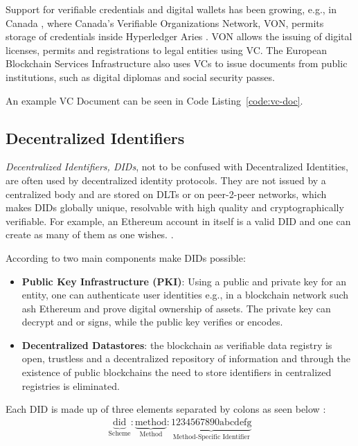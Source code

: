 Support for verifiable credentials and digital wallets has been growing, e.g., in Canada \cite{preukschat2021self},
where Canada's Verifiable Organizations Network, VON, permits storage of credentials inside Hyperledger Aries
\cite{hyperledger:wiki}. VON allows the issuing of digital licenses, permits and registrations to legal entities using
VC.
The European Blockchain Services Infrastructure also uses VCs to issue documents from public institutions, such as
digital diplomas and social security passes. \cite{williams2020cross}

An example VC Document can be seen in Code Listing~\ref{code:vc-doc}.

\subsection{Decentralized Identifiers} %
\label{sec:Decentralized Identifiers}
\textit{Decentralized Identifiers, DIDs}, not to be confused with Decentralized Identities, are often used by
decentralized identity protocols. \cite{w3c2022did} They are not issued by a centralized body and are stored on DLTs
or on peer-2-peer networks, which makes DIDs globally unique, resolvable with high quality and cryptographically
verifiable. \cite{w3c-did-primer} For example, an Ethereum account in itself is a valid DID and one can create as many
of them as one wishes. \cite{eth-decentralized-identity}.

According to \cite{eth-decentralized-identity} two main components make DIDs possible:
\begin{itemize}
	\item \textbf{Public Key Infrastructure (PKI)}: Using a public and private key for an entity, one can
	      authenticate user identities e.g., in a blockchain network such ash Ethereum and prove digital ownership
	      of assets.
	      The private key can decrypt and or signs, while the public key verifies or encodes.
	\item \textbf{Decentralized Datastores}: the blockchain as verifiable data registry is open, trustless and a
	      decentralized repository of information and through the existence of public blockchains the need to store
	      identifiers in centralized registries is eliminated.
\end{itemize}

Each DID is made up of three elements separated by colons as seen below \cite{w3c2022did}:
\begin{align*}
	\underbrace{\text{did}}_{\text{Scheme}} :
	\underbrace{\text{method}}_{\text{Method}} :
	\underbrace{\text{1234567890abcdefg}}_{\text{Method-Specific Identifier}}
\end{align*}

